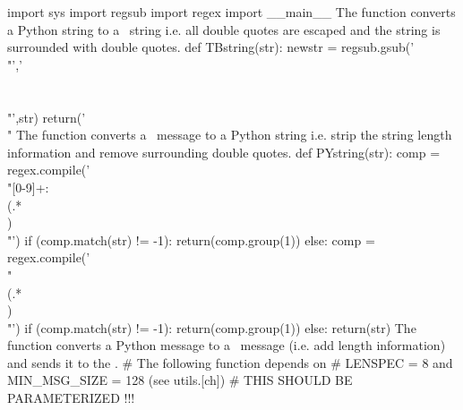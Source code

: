 import sys
import regsub
import regex
import __main__
\nwendcode{}\nwdocspar
The function  converts a Python string to a \TB\
string i.e. all double quotes are escaped and the string is surrounded
with double quotes.
\nwenddocs{}\plusendmoddef\let\nwnotused=\nwoutput{}\nwstartdeflinemarkup{}\nwenddeflinemarkup
def TBstring(str):
        newstr = regsub.gsub('\\"','\\\\\\"',str)
        return('\\"%
\nwendcode{}\nwdocspar
The function  converts a \TB\ message to a Python
string i.e. strip the string length information and remove surrounding 
double quotes.
\nwenddocs{}\plusendmoddef\let\nwnotused=\nwoutput{}\nwstartdeflinemarkup{}\nwenddeflinemarkup
def PYstring(str):
        comp = regex.compile('\\"[0-9]+:\\(.*\\)\\"')
        if (comp.match(str) != -1):
                return(comp.group(1))
        else:
                comp = regex.compile('\\"\\(.*\\)\\"')
                if (comp.match(str) != -1):
                        return(comp.group(1))
                else:
                        return(str)
\nwendcode{}\nwdocspar
The function  converts a Python message to a \TB\ message
(i.e. add length information) and sends it to the \TB.
\nwenddocs{}\plusendmoddef\let\nwnotused=\nwoutput{}\nwstartdeflinemarkup{}\nwenddeflinemarkup
# The following function depends on
# LENSPEC = 8 and MIN_MSG_SIZE = 128 (see utils.[ch])
# THIS SHOULD BE PARAMETERIZED !!!

